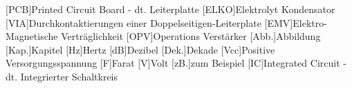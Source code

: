 
\begin{acronym}[ACRONYM]
[PCB]{Printed Circuit Board - dt. Leiterplatte}
[ELKO]{Elektrolyt Kondensator}
[VIA]{Durchkontaktierungen einer Doppelseitigen-Leiterplate}
[EMV]{Elektro-Magnetische Verträglichkeit}
[OPV]{Operations Verstärker}
[Abb.]{Abbildung}
[Kap.]{Kapitel}
[Hz]{Hertz}
[dB]{Dezibel}
[Dek.]{Dekade}
[Vcc]{Positive Versorgungsspannung}
[F]{Farat}
[V]{Volt}
[zB.]{zum Beispiel}
[IC]{Integrated Circuit - dt. Integrierter Schaltkreis}

\end{acronym}\newpage

